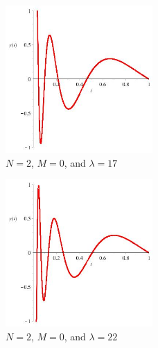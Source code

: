\documentclass[executivepaper]{article}
\begin{document}
\begin{center}
\begin{figure}[!ht]

\centering

\includegraphics[width=0.5\textwidth]{NEquals2MEquals0LambdaEquals17}

\caption{$N=2$, $M=0$, and $\lambda=17$}

\end{figure}

\vspace{5mm}

\begin{figure}[!ht]

\centering

\includegraphics[width=0.5\textwidth]{NEquals2MEquals0LambdaEquals22}

\caption{$N=2$, $M=0$, and $\lambda=22$}

\end{figure}

\end{center}
\end{document}
